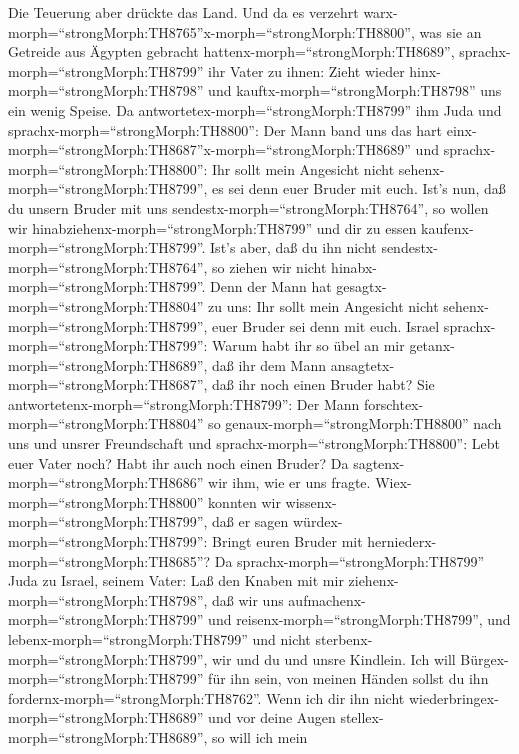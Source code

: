  Die Teuerung aber drückte das Land.  Und da es
verzehrt
warx-morph=``strongMorph:TH8765''x-morph=``strongMorph:TH8800'', was sie
an Getreide aus Ägypten gebracht hattenx-morph=``strongMorph:TH8689'',
sprachx-morph=``strongMorph:TH8799'' ihr Vater zu ihnen: Zieht wieder
hinx-morph=``strongMorph:TH8798'' und
kauftx-morph=``strongMorph:TH8798'' uns ein wenig Speise. 
Da antwortetex-morph=``strongMorph:TH8799'' ihm Juda und
sprachx-morph=``strongMorph:TH8800'': Der Mann band uns das hart
einx-morph=``strongMorph:TH8687''x-morph=``strongMorph:TH8689'' und
sprachx-morph=``strongMorph:TH8800'': Ihr sollt mein Angesicht nicht
sehenx-morph=``strongMorph:TH8799'', es sei denn euer Bruder mit euch.
 Ist's nun, daß du unsern Bruder mit uns
sendestx-morph=``strongMorph:TH8764'', so wollen wir
hinabziehenx-morph=``strongMorph:TH8799'' und dir zu essen
kaufenx-morph=``strongMorph:TH8799''.  Ist's aber, daß du
ihn nicht sendestx-morph=``strongMorph:TH8764'', so ziehen wir nicht
hinabx-morph=``strongMorph:TH8799''. Denn der Mann hat
gesagtx-morph=``strongMorph:TH8804'' zu uns: Ihr sollt mein Angesicht
nicht sehenx-morph=``strongMorph:TH8799'', euer Bruder sei denn mit
euch.  Israel sprachx-morph=``strongMorph:TH8799'': Warum
habt ihr so übel an mir getanx-morph=``strongMorph:TH8689'', daß ihr dem
Mann ansagtetx-morph=``strongMorph:TH8687'', daß ihr noch einen Bruder
habt?  Sie antwortetenx-morph=``strongMorph:TH8799'': Der
Mann forschtex-morph=``strongMorph:TH8804'' so
genaux-morph=``strongMorph:TH8800'' nach uns und unsrer Freundschaft und
sprachx-morph=``strongMorph:TH8800'': Lebt euer Vater noch? Habt ihr
auch noch einen Bruder? Da sagtenx-morph=``strongMorph:TH8686'' wir ihm,
wie er uns fragte. Wiex-morph=``strongMorph:TH8800'' konnten wir
wissenx-morph=``strongMorph:TH8799'', daß er sagen
würdex-morph=``strongMorph:TH8799'': Bringt euren Bruder mit
herniederx-morph=``strongMorph:TH8685''?  Da
sprachx-morph=``strongMorph:TH8799'' Juda zu Israel, seinem Vater: Laß
den Knaben mit mir ziehenx-morph=``strongMorph:TH8798'', daß wir uns
aufmachenx-morph=``strongMorph:TH8799'' und
reisenx-morph=``strongMorph:TH8799'', und
lebenx-morph=``strongMorph:TH8799'' und nicht
sterbenx-morph=``strongMorph:TH8799'', wir und du und unsre Kindlein.
 Ich will Bürgex-morph=``strongMorph:TH8799'' für ihn sein,
von meinen Händen sollst du ihn fordernx-morph=``strongMorph:TH8762''.
Wenn ich dir ihn nicht wiederbringex-morph=``strongMorph:TH8689'' und
vor deine Augen stellex-morph=``strongMorph:TH8689'', so will ich mein
